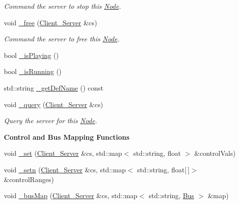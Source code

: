 \begin{DoxyCompactItemize}
\begin{DoxyCompactList}\small\item\em Command the server to stop this \hyperlink{classColliderPlusPlus_1_1Node}{Node}. \end{DoxyCompactList}\item 
\hypertarget{classColliderPlusPlus_1_1Node_abca0b4c65fc62a5f749bc8c9d9898211}{void \hyperlink{classColliderPlusPlus_1_1Node_abca0b4c65fc62a5f749bc8c9d9898211}{\-\_\-free} (\hyperlink{classColliderPlusPlus_1_1Client__Server}{Client\-\_\-\-Server} \&cs)}\label{classColliderPlusPlus_1_1Node_abca0b4c65fc62a5f749bc8c9d9898211}

\begin{DoxyCompactList}\small\item\em Command the server to free this \hyperlink{classColliderPlusPlus_1_1Node}{Node}. \end{DoxyCompactList}\item 
bool \hyperlink{classColliderPlusPlus_1_1Node_a52123c9868b5e1833750158c870c3b87}{\-\_\-is\-Playing} ()
\item 
bool \hyperlink{classColliderPlusPlus_1_1Node_a5f073a198b55b4c471e772ca2661d144}{\-\_\-is\-Running} ()
\item 
std\-::string \hyperlink{classColliderPlusPlus_1_1Node_a47ab8ce687a4336189a6cc629cdec56d}{\-\_\-get\-Def\-Name} () const 
\item 
\hypertarget{classColliderPlusPlus_1_1Node_a796ea51c38b6894b93ebafe8eae316b9}{void \hyperlink{classColliderPlusPlus_1_1Node_a796ea51c38b6894b93ebafe8eae316b9}{\-\_\-query} (\hyperlink{classColliderPlusPlus_1_1Client__Server}{Client\-\_\-\-Server} \&cs)}\label{classColliderPlusPlus_1_1Node_a796ea51c38b6894b93ebafe8eae316b9}

\begin{DoxyCompactList}\small\item\em Query the server for this \hyperlink{classColliderPlusPlus_1_1Node}{Node}. \end{DoxyCompactList}\end{DoxyCompactItemize}
\begin{Indent}{\bf Control and Bus Mapping Functions}\par
\begin{DoxyCompactItemize}
\item 
void \hyperlink{classColliderPlusPlus_1_1Node_a114d15e7c1f14462983f602fb2164dc1}{\-\_\-set} (\hyperlink{classColliderPlusPlus_1_1Client__Server}{Client\-\_\-\-Server} \&cs, std\-::map$<$ std\-::string, float $>$ \&control\-Vals)
\item 
void \hyperlink{classColliderPlusPlus_1_1Node_aef01261b4c0d4046c63a857b864ae824}{\-\_\-setn} (\hyperlink{classColliderPlusPlus_1_1Client__Server}{Client\-\_\-\-Server} \&cs, std\-::map$<$ std\-::string, float\mbox{[}$\,$\mbox{]}$>$ \&control\-Ranges)
\item 
void \hyperlink{classColliderPlusPlus_1_1Node_af654f15c4f2de2b96b69c1992d6de33e}{\-\_\-bus\-Map} (\hyperlink{classColliderPlusPlus_1_1Client__Server}{Client\-\_\-\-Server} \&cs, std\-::map$<$ std\-::string, \hyperlink{classColliderPlusPlus_1_1Bus}{Bus} $>$ \&map)
\end{DoxyCompactItemize}
\end{Indent}
